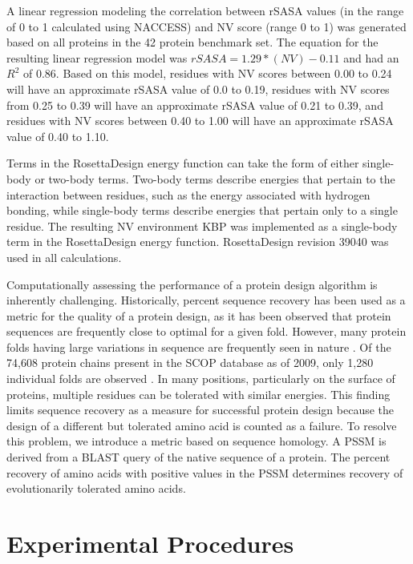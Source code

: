 A linear regression modeling the correlation between \ac{rSASA} values (in the range of 0 to 1 calculated using NACCESS) and \ac{NV} score (range 0 to 1) was generated based on all proteins in the 42 protein benchmark set.
The equation for the resulting linear regression model was $rSASA = 1.29*(NV)-0.11$ and had an $R^{2}$ of 0.86.
Based on this model, residues with \ac{NV} scores between 0.00 to 0.24 will have an approximate \ac{rSASA} value of 0.0 to 0.19, residues with \ac{NV} scores from 0.25 to 0.39 will have an approximate \ac{rSASA} value of 0.21 to 0.39, and residues with \ac{NV} scores between 0.40 to 1.00 will have an approximate \ac{rSASA} value of 0.40 to 1.10.

Terms in the RosettaDesign energy function can take the form of either single-body or two-body terms.
Two-body terms describe energies that pertain to the interaction between residues, such as the energy associated with hydrogen bonding, while single-body terms describe energies that pertain only to a single residue.
The resulting \ac{NV} environment \ac{KBP} was implemented as a single-body term in the RosettaDesign energy function.
RosettaDesign revision 39040 was used in all calculations.  

Computationally assessing the performance of a protein design algorithm is inherently challenging.
Historically, percent sequence recovery has been used as a metric for the quality of a protein design, as it has been observed that protein sequences are frequently close to optimal for a given fold\citep{Kuhlman:2000tc}.
However, many protein folds having large variations in sequence are frequently seen in nature \citep{Chothia:1986tm}.
Of the 74,608 protein chains present in the \ac{SCOP} database as of 2009, only 1,280 individual folds are observed \citep{Schaeffer:2011fe}.
In many positions, particularly on the surface of proteins, multiple residues can be tolerated with similar energies.
This finding limits sequence recovery as a measure for successful protein design because the design of a different but tolerated amino acid is counted as a failure.
To resolve this problem, we introduce a metric based on sequence homology. A \ac{PSSM} is derived from a \ac{BLAST} query of the native sequence of a protein.
The percent recovery of amino acids with positive values in the \ac{PSSM} determines recovery of evolutionarily tolerated amino acids. 

\section{Experimental Procedures}


